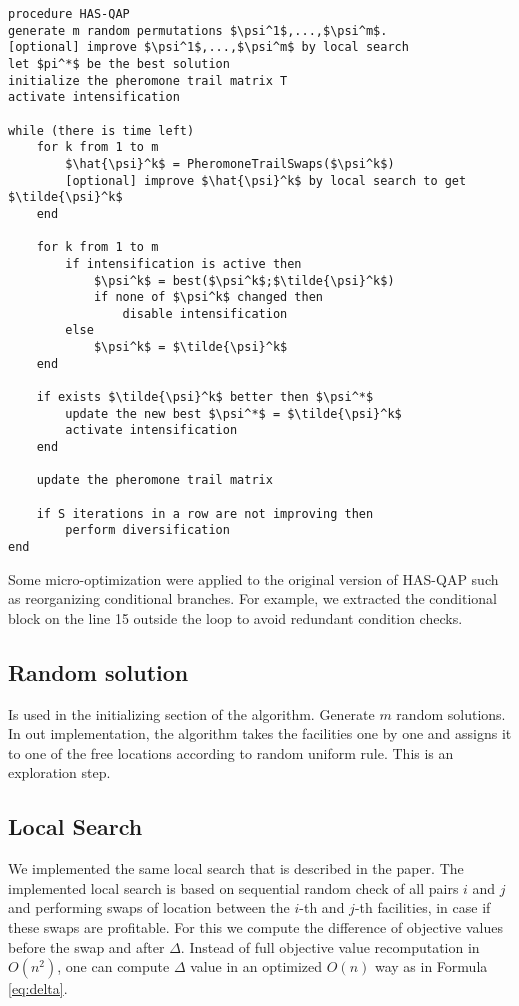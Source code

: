 \documentclass[12pt]{article}
\begin{document}
\begin{minipage}[c]{0.95\textwidth}
\begin{lstlisting}[caption={HAS-QAP pseudo-code}, label={lst:has-qap},mathescape]
procedure HAS-QAP
generate m random permutations $\psi^1$,...,$\psi^m$.
[optional] improve $\psi^1$,...,$\psi^m$ by local search
let $pi^*$ be the best solution
initialize the pheromone trail matrix T
activate intensification

while (there is time left)
	for k from 1 to m
		$\hat{\psi}^k$ = PheromoneTrailSwaps($\psi^k$)
		[optional] improve $\hat{\psi}^k$ by local search to get $\tilde{\psi}^k$
	end
	
	for k from 1 to m
		if intensification is active then
			$\psi^k$ = best($\psi^k$;$\tilde{\psi}^k$)		
			if none of $\psi^k$ changed then
				disable intensification
		else
			$\psi^k$ = $\tilde{\psi}^k$
	end
	
	if exists $\tilde{\psi}^k$ better then $\psi^*$
		update the new best $\psi^*$ = $\tilde{\psi}^k$
		activate intensification
	end
	
	update the pheromone trail matrix
	
	if S iterations in a row are not improving then
		perform diversification
end
\end{lstlisting}
\end{minipage}


Some micro-optimization were applied to the original version of HAS-QAP such as reorganizing conditional branches. For example, we extracted the conditional block on the line 15 outside the loop to avoid redundant condition checks.

\subsection{Random solution}
Is used in the initializing section of the algorithm. Generate $m$ random solutions. In out implementation, the algorithm takes the facilities one by one and assigns it to one of the free locations according to random uniform rule. This is an exploration step.

\subsection{Local Search}

We implemented the same local search that is described in the paper. The implemented local search is based on sequential random check of all pairs $i$ and $j$ and performing swaps of location between the $i$-th and $j$-th facilities, in case if these swaps are profitable. For this we compute the difference of objective values before the swap and after $\Delta$. Instead of full objective value recomputation in $O(n^2)$, one can compute $\Delta$ value in an optimized $O(n)$ way as in Formula \ref{eq:delta}.
\end{document}
